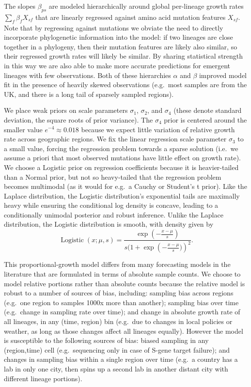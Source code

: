 \documentclass[12pt]{article}
\begin{document}
The slopes $\beta_{ps}$ are modeled hierarchically around global per-lineage growth rates $\sum_f \beta_f X_{sf}$ that are linearly regressed against amino acid mutation features $X_{sf}$.
Note that by regressing against mutations we obviate the need to directly incorporate phylogenetic information into the model: if two lineages are close together in a phylogeny, then their mutation features are likely also similar, so their regressed growth rates will likely be similar.
By sharing statistical strength in this way we are also able to make more accurate predictions for emergent lineages with few observations.
Both of these hierarchies $\alpha$ and $\beta$ improved model fit in the presence of heavily skewed observations (e.g.~most samples are from the UK, and there is a long tail of sparsely sampled regions).

We place weak priors on scale parameters $\sigma_1$, $\sigma_2$, and $\sigma_4$ (these denote standard deviation, the square roots of prior variance).
The $\sigma_4$ prior is centered around the smaller value $e^{-4}\approx 0.018$ because we expect little variation of relative growth rate across geographic regions.
We fix the linear regression scale parameter $\sigma_3$ to a small value, forcing the regression problem towards a sparse solution (i.e.~we assume a priori that most observed mutations have little effect on growth rate).
We choose a Logistic prior on regression coefficients because it is heavier-tailed than a Normal prior, but not so heavy-tailed that the regression problem becomes multimodal (as it would for e.g.~a Cauchy or Student's t prior).
Like the Laplace distribution, the Logistic distribution's exponential tails are maximally heavy while ensuring the conditional log density is concave, leading to a conditionally unimodal posterior and robust inference.
Unlike the Laplace distribution, the Logistic distribution is smooth, with density given by
$$
\operatorname{Logistic}(x;\mu,s) = \frac
    {\exp(-\frac{x-\mu}s)}
    {s(1 + \exp\left(-\frac{x-\mu}s)\right)^2}.
$$

This proportional-growth model differs from many forecasting models in the literature that are formulated in terms of absolute sample counts.
We choose to model relative portions rather than absolute counts because the relative model is robust to a number of sources of bias, including:
sampling bias across regions (e.g.~one region to samples 1000x more than another);
sampling bias over time (e.g.~change in sampling rate over time); and
change in absolute growth rate of all lineages, in any (time, region) bin (e.g.~due to changes in local policies or weather, as long as those changes affect all lineages equally).
However the model is susceptible to the following sources of bias:
biased sampling in any (region,time) cell (e.g.~sequencing only in case of S-gene target failure); and changes in sampling bias within a single region over time (e.g.~a country has a lab in only one city, then spins up a second lab in another distant city with different lineage portions).
\end{document}
